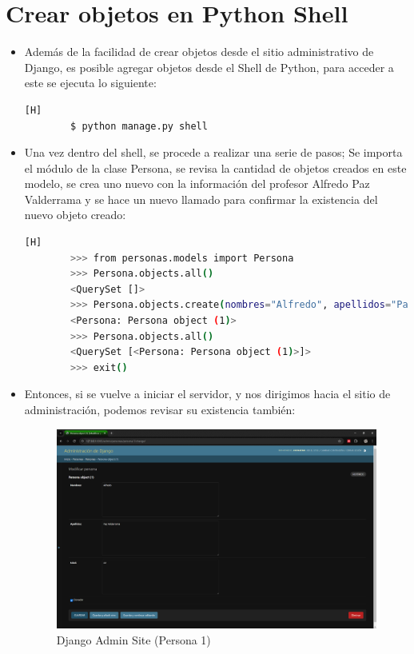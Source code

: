 \documentclass{article}
\begin{document}
    \section{Crear objetos en Python Shell}
        \begin{itemize}
            \item Además de la facilidad de crear objetos desde el sitio administrativo de Django, es posible agregar objetos desde el Shell de Python, para acceder a este se ejecuta lo siguiente:


        \begin{lstlisting}[language=bash,caption={Ingresando a Python Shell}][H]
        $ python manage.py shell
        \end{lstlisting}
            \item Una vez dentro del shell, se procede a realizar una serie de pasos; Se importa el módulo de la clase Persona, se revisa la cantidad de objetos creados en este modelo, se crea uno nuevo con la información del profesor Alfredo Paz Valderrama y se hace un nuevo llamado para confirmar la existencia del nuevo objeto creado:

        \begin{lstlisting}[language=bash,caption={Creación de un nuevo objeto desde el shell}][H]
        >>> from personas.models import Persona
        >>> Persona.objects.all()
        <QuerySet []>
        >>> Persona.objects.create(nombres="Alfredo", apellidos="Paz Valderrama", edad="23")
        <Persona: Persona object (1)>
        >>> Persona.objects.all()
        <QuerySet [<Persona: Persona object (1)>]>
        >>> exit()
        \end{lstlisting}
            \item Entonces, si se vuelve a iniciar el servidor, y nos dirigimos hacia el sitio de administración, podemos revisar su existencia también:
        \begin{figure}[H]
            \centering
            \includegraphics[width=1\linewidth]{img/Persona1.png}
            \caption{Django Admin Site (Persona 1)}
            \label{fig:enter-label}
        \end{figure}
        \end{itemize}
\end{document}
